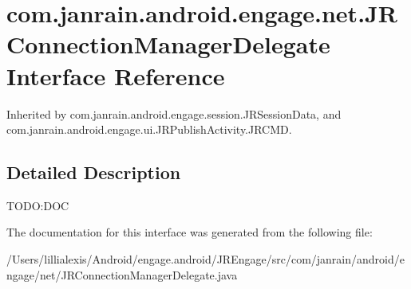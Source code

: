 \hypertarget{interfacecom_1_1janrain_1_1android_1_1engage_1_1net_1_1_j_r_connection_manager_delegate}{
\section{com.janrain.android.engage.net.JRConnectionManagerDelegate Interface Reference}
\label{interfacecom_1_1janrain_1_1android_1_1engage_1_1net_1_1_j_r_connection_manager_delegate}
}


Inherited by com.janrain.android.engage.session.JRSessionData, and com.janrain.android.engage.ui.JRPublishActivity.JRCMD.



\subsection{Detailed Description}
TODO:DOC 

The documentation for this interface was generated from the following file:\begin{DoxyCompactItemize}
\item 
/Users/lillialexis/Android/engage.android/JREngage/src/com/janrain/android/engage/net/JRConnectionManagerDelegate.java\end{DoxyCompactItemize}

